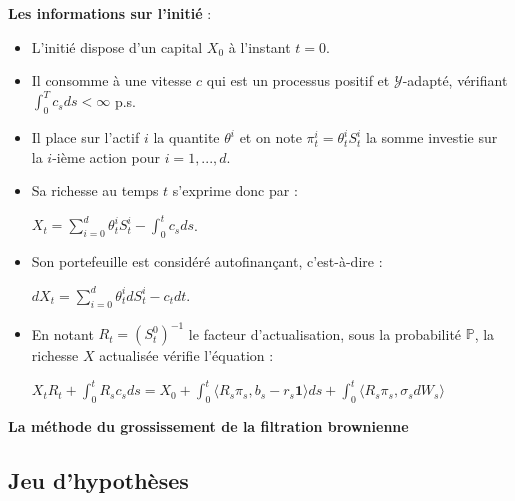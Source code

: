 \documentclass[french]{beamer}
\begin{document}
\begin{frame}
\textbf{Les informations sur l'initié} : 
\begin{itemize}
\item L'initié dispose d'un capital $X_0$ à l'instant $t=0$.
\item Il consomme à une vitesse $c$ qui est un processus positif et $\mathcal{Y}$-adapté, vérifiant $\int_{0}^{T} c_sds < \infty$ p.s. 
\item Il place sur l'actif $i$ la quantite $\theta^i$ et on note $\pi^i_t = \theta^i_t S^i_t$ la somme investie sur la $i$-ième action pour $i = 1,...,d$.
\item Sa richesse au temps $t$ s'exprime donc par :
\begin{center}
$X_t = \sum_{i=0}^{d} \theta^i_t S^i_t - \int_{0}^{t} c_s ds$.
\end{center}
\end{itemize}
\end{frame}
\newpage 

\begin{frame}
\begin{itemize}
\item Son portefeuille est considéré autofinançant, c'est-à-dire : 
\begin{center}
$dX_t = \sum_{i=0}^{d}\theta^i_t dS^i_t - c_t dt$.
\end{center}
\item En notant $R_t = (S^0_t)^{-1}$ le facteur d'actualisation, sous la probabilité $\mathbb{P}$, la richesse $X$ actualisée vérifie l'équation : 
\begin{center}
$X_t R_t + \int_{0}^{t} R_s c_s ds = X_0 +  \int_{0}^{t} \langle R_s\pi_s, b_s - r_s \textbf{1} \rangle ds + \int_{0}^{t} \langle R_s \pi_s, \sigma_s dW_s \rangle$
\end{center}
\end{itemize}
\end{frame}
\newpage

\begin{frame}
\textbf{La méthode du grossissement de la filtration brownienne}
\end{frame}

\subsection{Jeu d'hypothèses}
\end{document}
